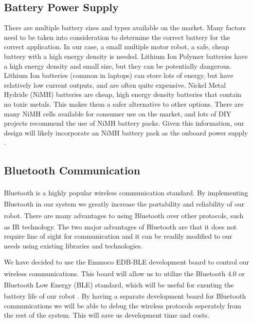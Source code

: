 \documentclass[11pt]{report}
\begin{document}
\begin{spacing}{1.5}
\subsection*{Battery Power Supply}

There are multiple battery sizes and types available on the market. Many factors need to be taken into consideration to determine the correct battery for the correct application. In our case, a small multiple motor robot, a safe, cheap battery with a high energy density is needed. Lithium Ion Polymer batteries have a high energy density and small size, but they can be potentially dangerous. Lithium Ion batteries (common in laptops) can store lots of energy, but have relatively low current outputs, and are often quite expensive. Nickel Metal Hydride (NiMH) batteries are cheap, high energy density batteries that contain no toxic metals. This makes them a safer alternative to other options. There are many NiMH cells available for consumer use on the market, and lots of DIY projects recommend the use of NiMH battery packs. Given this information, our design will likely incorporate an NiMH battery pack as the onboard power supply \cite{Calin}.

\subsection*{Bluetooth\textsuperscript{\textregistered} Communication}

Bluetooth\textsuperscript{\textregistered} is a highly popular wireless communication standard.  By implementing Bluetooth\textsuperscript{\textregistered} in our system we greatly increase the portability and reliability of our robot.  There are many advantages to using Bluetooth\textsuperscript{\textregistered} over other protocols, such as IR technology.  The two major advantages of Bluetooth\textsuperscript{\textregistered} are that it does not require line of sight for communication and it can be readily modified to our needs using existing libraries and technologies.

We have decided to use the Emmoco EDB-BLE development board to control our wireless communications.  This board will allow us to utilize the Bluetooth\textsuperscript{\textregistered} 4.0 or Bluetooth\textsuperscript{\textregistered} Low Energy (BLE) standard, which will be useful for exenting the battery life of our robot \cite{Nokia}.  By having a separate development board for Bluetooth\textsuperscript{\textregistered} communications we will be able to debug the wireless protocols seperately from the rest of the system.  This will save us development time and costs.


\end{spacing}
\end{document}
